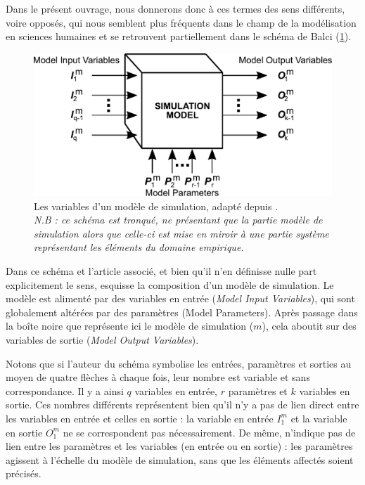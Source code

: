 Dans le présent ouvrage, nous donnerons donc à ces termes des sens différents, voire opposés, qui nous semblent plus fréquents dans le champ de la modélisation en sciences humaines et se retrouvent partiellement dans le schéma de Balci (\cref{fig:parametres-Balci}).

\begin{figure}[H]
	\centering
	\includegraphics[width=.8\linewidth]{img/schema_parametres_balci.pdf}
	\caption[Les variables d'un modèle de simulation selon \citeauthor{balci_validation_1994}]{Les variables d'un modèle de simulation, adapté depuis \textcite[122]{balci_validation_1994}.\\
	\textit{N.B : ce schéma est tronqué, ne présentant que la partie \og modèle de simulation\fg{} alors que celle-ci est mise en miroir à une partie \og système\fg{} représentant les éléments du domaine empirique.}}
	\label{fig:parametres-Balci} 
\end{figure}

Dans ce schéma et l'article associé, et bien qu'il n'en définisse nulle part explicitement le sens, \citeauthor{balci_validation_1994} esquisse la composition d'un modèle de simulation.
Le modèle est alimenté par des variables en entrée (\textit{Model Input Variables}), qui sont globalement altérées par des paramètres (Model Parameters).
Après passage dans la \og boîte noire\fg{} que représente ici le modèle de simulation ($m$), cela aboutit sur des variables de sortie (\textit{Model Output Variables}).

Notons que si l'auteur du schéma symbolise les entrées, paramètres et sorties au moyen de quatre flèches à chaque fois, leur nombre est variable et sans correspondance.
Il y a ainsi $q$ variables en entrée, $r$ paramètres et $k$ variables en sortie.
Ces nombres différents représentent bien qu'il n'y a pas de lien direct entre les variables en entrée et celles en sortie : la variable en entrée $I_{1}^m$ et la variable en sortie $O_{1}^m$ ne se correspondent pas nécessairement.
De même, \citeauthor{balci_validation_1994} n'indique pas de lien entre les paramètres et les variables (en entrée ou en sortie) : les paramètres agissent à l'échelle du modèle de simulation, sans que les éléments affectés soient précisés.

